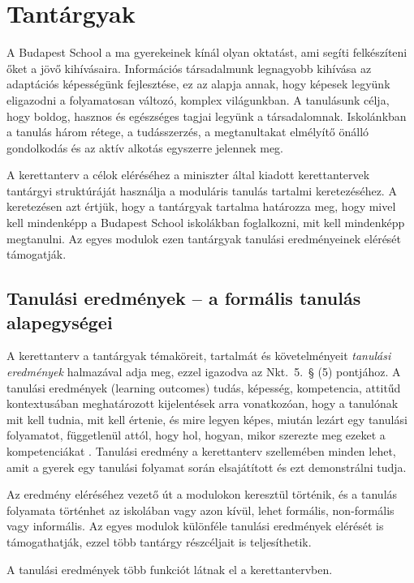 \section{Tantárgyak}
\label{sec:tantargyak}
A Budapest School a ma gyerekeinek kínál olyan oktatást, ami segíti felkészíteni őket a jövő kihívásaira. Információs társadalmunk legnagyobb kihívása az adaptációs képességünk fejlesztése, ez az alapja annak, hogy képesek legyünk eligazodni a folyamatosan változó, komplex világunkban. A tanulásunk célja, hogy boldog, hasznos és egészséges tagjai legyünk a társadalomnak. Iskolánkban a tanulás három rétege, a tudásszerzés, a megtanultakat elmélyítő önálló gondolkodás és az aktív alkotás egyszerre jelennek meg.

A kerettanterv a célok eléréséhez a miniszter által kiadott kerettantervek tantárgyi struktúráját használja  a moduláris tanulás tartalmi keretezéséhez. A keretezésen azt értjük, hogy a tantárgyak tartalma határozza meg, hogy mivel kell mindenképp a Budapest School iskolákban foglalkozni, mit kell mindenképp megtanulni. 
Az egyes modulok ezen tantárgyak tanulási eredményeinek elérését támogatják.

\subsection{Tanulási eredmények -- a formális tanulás alapegységei}
\label{sec:tanulasi_eredmenyek}
A kerettanterv a tantárgyak témaköreit, tartalmát és követelményeit \emph{tanulási eredmények} halmazával adja meg, ezzel igazodva az Nkt.~5.~§ (5) pontjához. A tanulási eredmények (learning out\-comes) tudás, képesség, kompetencia, attitűd kontextusában meghatározott kijelentések arra vonatkozóan, hogy a tanulónak mit kell tudnia, mit kell értenie, és mire legyen képes, miután lezárt egy tanulási folyamatot, függetlenül attól, hogy hol, hogyan, mikor szerezte meg ezeket a kompetenciákat \citep{learning_outcomes}.  Tanulási eredmény a kerettanterv szellemében minden lehet, amit a gyerek egy tanulási folyamat során elsajátított és ezt demonstrálni tudja.

Az eredmény eléréséhez vezető út a modulokon keresztül történik, és a tanulás folyamata történhet az iskolában vagy azon kívül, lehet formális, non-formális vagy informális.
Az egyes modulok különféle tanulási eredmények elérését is támogathatják, ezzel több tantárgy részcéljait is teljesíthetik.

A tanulási eredmények több funkciót látnak el a kerettantervben.

